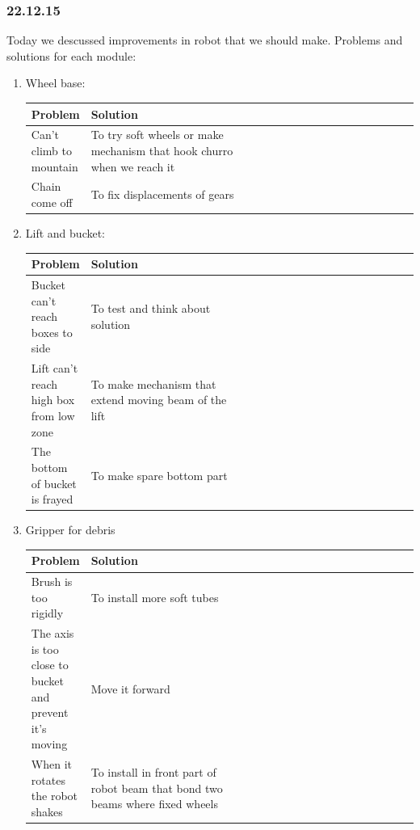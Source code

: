 \subsubsection{22.12.15}
	Today we descussed improvements in robot that we should make.\newline
	Problems and solutions for each module:
	\begin{enumerate}
		\item Wheel base:
		\begin{table}[H]
			\vspace{-2mm}
			\begin{center}
				\begin{tabular}{|p{0.15\linewidth}|p{0.4\linewidth}|p{0.55\linewidth}}
					\hline
					Problem & Solution\\
					\hline
					Can't climb to mountain  & To try soft wheels or make mechanism that hook churro when we reach it \\	
					\hline
					Chain come off & To fix displacements of gears\\
					\hline
				\end{tabular}
			\end{center}
		\end{table}
		\item Lift and bucket:
		\begin{table}[H]
			\vspace{-2mm}
			\begin{center}
				\begin{tabular}{|p{0.15\linewidth}|p{0.4\linewidth}|p{0.55\linewidth}}
					\hline
					Problem & Solution\\
					\hline
					Bucket can't reach boxes to side  & To test and think about solution   \\	
					\hline
					Lift can't reach high box from low zone & To make mechanism that extend moving beam of the lift\\
					\hline
					The bottom of bucket is frayed & To make spare bottom part\\
					\hline
				\end{tabular}
			\end{center}
		\end{table}
		\item Gripper for debris
		\begin{table}[H]
			\vspace{-2mm}
			\begin{center}
				\begin{tabular}{|p{0.15\linewidth}|p{0.4\linewidth}|p{0.55\linewidth}}
					\hline
					Problem & Solution\\
					\hline
					Brush is too rigidly  & To install more soft tubes \\	
					\hline
					The axis is too close to bucket and prevent it's moving  & Move it forward \\	
					\hline
					When it rotates the robot shakes & To install in front part of robot beam that bond two beams where fixed wheels \\	
					\hline
				\end{tabular}
			\end{center}
		\end{table}
		

\end{enumerate}

